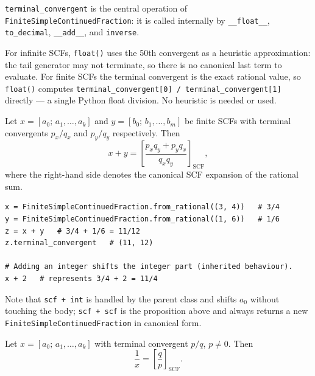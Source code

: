 \texttt{terminal\_convergent} is the central operation of
\texttt{FiniteSimpleContinuedFraction}: it is called internally by
\texttt{\_\_float\_\_}, \texttt{to\_decimal}, \texttt{\_\_add\_\_}, and
\texttt{inverse}.

\begin{remark}
  For infinite SCFs, \texttt{float()} uses the 50th convergent as a
  heuristic approximation: the tail generator may not terminate, so there is
  no canonical last term to evaluate.  For finite SCFs the terminal
  convergent is the exact rational value, so \texttt{float()} computes
  \texttt{terminal\_convergent[0] / terminal\_convergent[1]} directly — a
  single Python float division.  No heuristic is needed or used.
\end{remark}

\begin{proposition}\label{prop:fscf-add}
  Let $x = [a_0;\, a_1, \ldots, a_k]$ and $y = [b_0;\, b_1, \ldots, b_m]$ be finite
  SCFs with terminal convergents $p_x / q_x$ and $p_y / q_y$ respectively.
  Then
  \[
    x + y = \left[\frac{p_x q_y + p_y q_x}{q_x q_y}\right]_{\!\mathrm{SCF}},
  \]
  where the right-hand side denotes the canonical SCF expansion of the
  rational sum.
\end{proposition}

\begin{catenadef}
\begin{lstlisting}[style=python]
x = FiniteSimpleContinuedFraction.from_rational((3, 4))   # 3/4
y = FiniteSimpleContinuedFraction.from_rational((1, 6))   # 1/6
z = x + y   # 3/4 + 1/6 = 11/12
z.terminal_convergent   # (11, 12)

# Adding an integer shifts the integer part (inherited behaviour).
x + 2   # represents 3/4 + 2 = 11/4
\end{lstlisting}
\end{catenadef}

Note that \texttt{scf + int} is handled by the parent class and shifts
$a_0$ without touching the body; \texttt{scf + scf} is the proposition above
and always returns a new \texttt{FiniteSimpleContinuedFraction} in canonical
form.

\begin{proposition}\label{prop:fscf-inv}
  Let $x = [a_0;\, a_1, \ldots, a_k]$ with terminal convergent $p / q$,
  $p \neq 0$.  Then
  \[
    \frac{1}{x} = \left[\frac{q}{p}\right]_{\!\mathrm{SCF}}.
  \]
\end{proposition}


